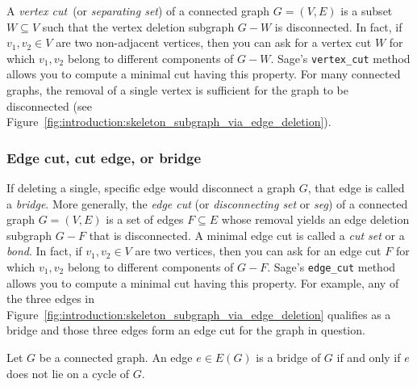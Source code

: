 A \emph{vertex cut}~(or
\emph{separating set}) of a connected graph
$G = (V, E)$ is a subset $W \subseteq V$ such that the vertex deletion
subgraph $G - W$ is disconnected. In fact, if $v_1, v_2 \in V$ are two
non-adjacent vertices, then you can ask for a vertex cut $W$ for which
$v_1, v_2$ belong to different components of $G - W$. Sage's
\verb!vertex_cut! method allows you to compute a minimal cut having
this property. For many connected graphs, the removal of a single
vertex is sufficient for the graph to be disconnected
(see Figure~\ref{fig:introduction:skeleton_subgraph_via_edge_deletion}).



\subsubsection{Edge cut, cut edge, or bridge}

If deleting a single, specific edge would disconnect a graph $G$, that
edge is called a \emph{bridge}. More generally, the
\emph{edge cut} (or
\emph{disconnecting set} or \emph{seg}) of a
connected graph $G = (V, E)$ is a set of edges $F \subseteq E$ whose
removal yields an edge deletion subgraph $G - F$ that is
disconnected. A minimal edge cut is called a
\emph{cut set} or a \emph{bond}. In fact,
if $v_1, v_2 \in V$ are two vertices, then you can ask for an edge cut
$F$ for which $v_1, v_2$ belong to different components of $G -
F$. Sage's \verb!edge_cut! method allows you to compute a minimal cut
having this property. For example, any of the three edges in
Figure~\ref{fig:introduction:skeleton_subgraph_via_edge_deletion}
qualifies as a bridge and those three edges form an edge cut for the
graph in question.

\begin{theorem}
\label{thm:inroduction:edge_is_bridge_iff_edge_not_on_cycle}
Let $G$ be a connected graph. An edge $e \in E(G)$ is a bridge of $G$
if and only if $e$ does not lie on a cycle of $G$.
\end{theorem}

